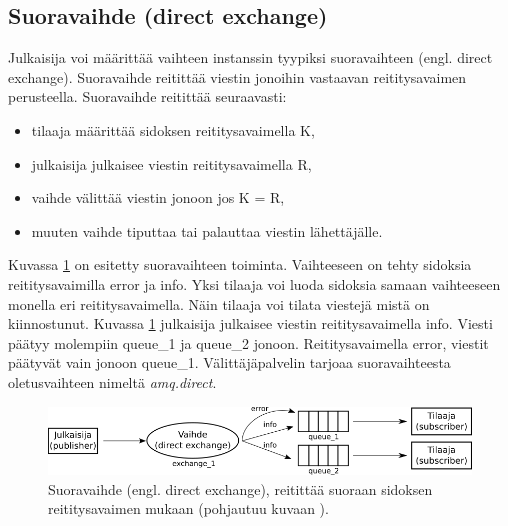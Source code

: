 \subsection{Suoravaihde (direct exchange)}
\label{ch:direct-exchange}
Julkaisija voi määrittää vaihteen instanssin tyypiksi suoravaihteen (engl. direct exchange). Suoravaihde reitittää viestin jonoihin vastaavan reititysavaimen perusteella. Suoravaihde reitittää seuraavasti:
\begin{itemize}
	\item tilaaja määrittää sidoksen reititysavaimella K,
	\item julkaisija julkaisee viestin reititysavaimella R,
	\item vaihde välittää viestin jonoon jos K = R,
	\item muuten vaihde tiputtaa tai palauttaa viestin lähettäjälle.
\end{itemize}
Kuvassa \ref{fig:amqp-direct-exchange} on esitetty suoravaihteen toiminta. Vaihteeseen on tehty sidoksia reititysavaimilla error ja info. Yksi tilaaja voi luoda sidoksia samaan vaihteeseen monella eri reititysavaimella. Näin tilaaja voi tilata viestejä mistä on kiinnostunut. Kuvassa \ref{fig:amqp-direct-exchange} julkaisija julkaisee viestin reititysavaimella info. Viesti päätyy molempiin queue\_1 ja queue\_2 jonoon. Reititysavaimella error, viestit päätyvät vain jonoon queue\_1. Välittäjäpalvelin tarjoaa suoravaihteesta oletusvaihteen nimeltä \emph{amq.direct}. \mbox{\cite[s.~27]{AMQP-specification}}

\begin{figure}[ht!]
	\includegraphics[width=1\textwidth]{pictures/amqp-direct-exchange.png}
	\caption{Suoravaihde (engl. direct exchange), reitittää suoraan sidoksen reititysavaimen mukaan (pohjautuu kuvaan \mbox{\cite{RabbitMQ-Tutorial-Routing}}).}
	\label{fig:amqp-direct-exchange}
\end{figure}


